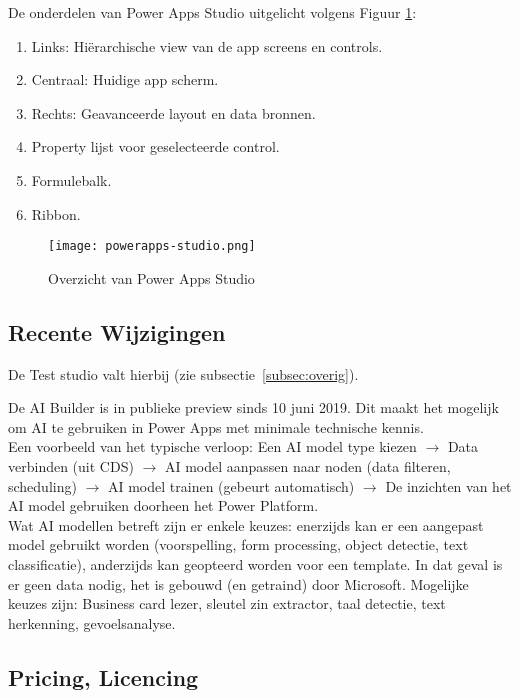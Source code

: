 De onderdelen van Power Apps Studio uitgelicht volgens Figuur \ref{fig:pastudio}:
\begin{enumerate}
    \item Links: Hiërarchische view van de app screens en controls.
    \item Centraal: Huidige app scherm.
    \item Rechts: Geavanceerde layout en data bronnen.
    \item Property lijst voor geselecteerde control.
    \item Formulebalk.
    \item Ribbon.
\end{enumerate}

\begin{figure}[h!]
    \texttt{[image: powerapps-studio.png]}
    \caption{Overzicht van Power Apps Studio \autocite{MicrosoftDocs2017}}
    \label{fig:pastudio}
\end{figure}

\subsection{Recente Wijzigingen}
\label{subsec:recente-wijzigingen}

De Test studio valt hierbij (zie subsectie~\ref{subsec:overig}). %

De AI Builder is in publieke preview sinds 10 juni 2019. Dit maakt het mogelijk om AI te gebruiken in Power Apps met minimale technische kennis.\\
Een voorbeeld van het typische verloop: Een AI model type kiezen $\rightarrow$ Data verbinden (uit CDS) $\rightarrow$ AI model aanpassen naar noden (data filteren, scheduling) $\rightarrow$ AI model trainen (gebeurt automatisch) $\rightarrow$ De inzichten van het AI model gebruiken doorheen het Power Platform.\\
Wat AI modellen betreft zijn er enkele keuzes: enerzijds kan er een aangepast model gebruikt worden (voorspelling, form processing, object detectie, text classificatie), anderzijds kan geopteerd worden voor een template. In dat geval is er geen data nodig, het is gebouwd (en getraind) door Microsoft. Mogelijke keuzes zijn: Business card lezer, sleutel zin extractor, taal detectie, text herkenning, gevoelsanalyse. \autocite{MicrosoftDocs2019e}


\subsection{Pricing, Licencing}

